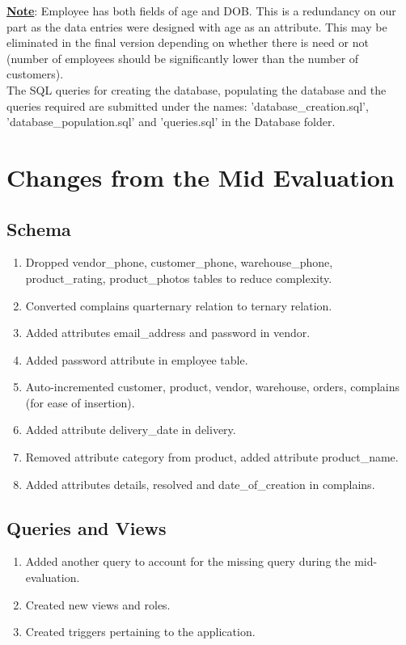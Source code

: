 \documentclass[12pt]{report}
\begin{document}
\textbf{\underline{ Note}}: Employee has both fields of age and DOB. This is a redundancy on our part as the data entries were designed with age as an attribute. This may be eliminated in the final version depending on whether there is need or not (number of employees should be significantly lower than the number of customers).
\\
The SQL queries for creating the database, populating the database and the queries required are submitted under the names: 'database\_creation.sql', 'database\_population.sql' and 'queries.sql' in the Database folder.

\chapter{Changes from the Mid Evaluation}


    \section{Schema}
        \begin{enumerate}
            \item Dropped vendor\_phone, customer\_phone, warehouse\_phone, product\_rating, product\_photos tables to reduce complexity.
            \item Converted complains quarternary relation to ternary relation.
            \item Added attributes email\_address and password in vendor.
            \item Added password attribute in employee table.
            \item Auto-incremented customer, product, vendor, warehouse, orders, complains (for ease of insertion).
            \item Added attribute delivery\_date in delivery.
            \item Removed attribute category from product, added attribute product\_name.
            \item Added attributes details, resolved and date\_of\_creation in complains.
        \end{enumerate}

    \section{Queries and Views}
        \begin{enumerate}
            \item Added another query to account for the missing query during the mid-evaluation.
            \item Created new views and roles.
            \item Created triggers pertaining to the application.
        \end{enumerate}
\end{document}
